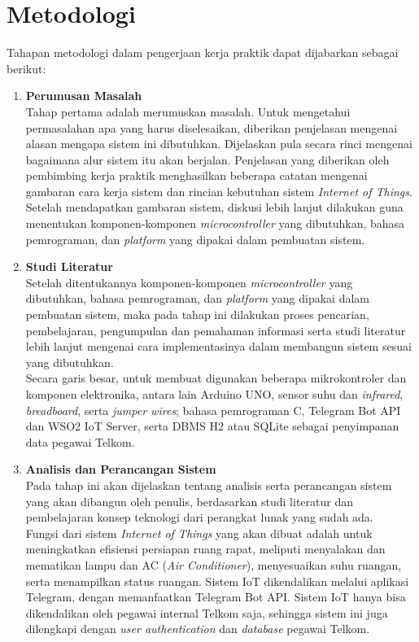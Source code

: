 \section{Metodologi}
\tab Tahapan metodologi dalam pengerjaan kerja praktik dapat dijabarkan sebagai berikut:
\begin{enumerate}
	\item \textbf{Perumusan Masalah}\\
	\tab Tahap pertama adalah merumuskan masalah. Untuk mengetahui permasalahan apa yang harus diselesaikan, diberikan penjelasan mengenai alasan mengapa sistem ini dibutuhkan. Dijelaskan pula secara rinci mengenai bagaimana alur sistem itu akan berjalan. Penjelasan yang diberikan oleh pembimbing kerja praktik menghasilkan beberapa catatan mengenai gambaran cara kerja sistem dan rincian kebutuhan sistem \textit{Internet of Things}. Setelah mendapatkan gambaran sistem, diskusi lebih lanjut dilakukan guna menentukan komponen-komponen \textit{microcontroller} yang dibutuhkan, bahasa pemrograman, dan \textit{platform} yang dipakai dalam pembuatan sistem.\\
	
	\item \textbf{Studi Literatur}\\
	\tab Setelah ditentukannya komponen-komponen \textit{microcontroller} yang dibutuhkan, bahasa pemrograman, dan \textit{platform} yang dipakai dalam pembuatan sistem, maka pada tahap ini dilakukan proses pencarian, pembelajaran, pengumpulan
	dan pemahaman informasi serta studi literatur lebih lanjut mengenai cara implementasinya dalam membangun sistem sesuai yang dibutuhkan.\\
	\tab Secara garis besar, untuk membuat \namaSistem digunakan beberapa mikrokontroler dan komponen elektronika, antara lain Arduino UNO, sensor suhu dan \textit{infrared}, \textit{breadboard}, serta \textit{jumper wires}; bahasa pemrograman C, Telegram Bot API dan WSO2 IoT Server, serta DBMS H2 atau SQLite sebagai penyimpanan data pegawai Telkom.\\
	
	\item \textbf{Analisis dan Perancangan Sistem}\\
	\tab Pada tahap ini akan dijelaskan tentang analisis serta perancangan sistem yang akan dibangun oleh penulis, berdasarkan studi literatur dan pembelajaran konsep teknologi dari perangkat lunak yang sudah ada.\\
	\tab Fungsi dari sistem \textit{Internet of Things} yang akan dibuat adalah untuk meningkatkan efisiensi persiapan ruang rapat, meliputi menyalakan dan mematikan lampu dan AC (\textit{Air Conditioner}), menyesuaikan suhu ruangan, serta menampilkan status ruangan. Sistem IoT dikendalikan melalui aplikasi Telegram, dengan memanfaatkan Telegram Bot API. Sistem IoT hanya bisa dikendalikan oleh pegawai internal Telkom saja, sehingga sistem ini juga dilengkapi dengan \textit{user authentication} dan \textit{database} pegawai Telkom.\\
	

\end{enumerate}
